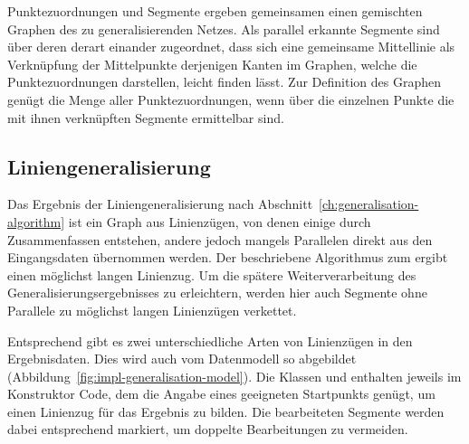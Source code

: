 \documentclass[../main/thesis.tex]{subfiles}
\begin{document}

Punktezuordnungen und Segmente ergeben gemeinsamen einen gemischten Graphen des zu generalisierenden Netzes.
Als parallel erkannte Segmente sind über deren  derart einander zugeordnet, dass sich eine gemeinsame Mittellinie als Verknüpfung der Mittelpunkte derjenigen Kanten im Graphen, welche die Punktezuordnungen darstellen, leicht finden lässt.
Zur Definition des Graphen genügt die Menge aller Punktezuordnungen, wenn über die einzelnen Punkte die mit ihnen verknüpften Segmente ermittelbar sind.




\subsection{Liniengeneralisierung}
\label{ch:impl-generalisation}

Das Ergebnis der Liniengeneralisierung nach Abschnitt~\ref{ch:generalisation-algorithm} ist ein Graph aus Linienzügen, von denen einige durch Zusammenfassen entstehen, andere jedoch mangels Parallelen direkt aus den Eingangsdaten übernommen werden.
Der beschriebene Algorithmus zum  ergibt einen möglichst langen Linienzug.
Um die spätere Weiterverarbeitung des Generalisierungsergebnisses zu erleichtern, werden hier auch Segmente ohne Parallele zu möglichst langen Linienzügen verkettet.


Entsprechend gibt es zwei unterschiedliche Arten von Linienzügen in den Ergebnisdaten.
Dies wird auch vom Datenmodell so abgebildet (Abbildung~\ref{fig:impl-generalisation-model}).
Die Klassen  und  enthalten jeweils im Konstruktor Code, dem die Angabe eines geeigneten Startpunkts genügt, um einen Linienzug für das Ergebnis zu bilden.
Die bearbeiteten Segmente werden dabei entsprechend markiert, um doppelte Bearbeitungen zu vermeiden.
\end{document}
